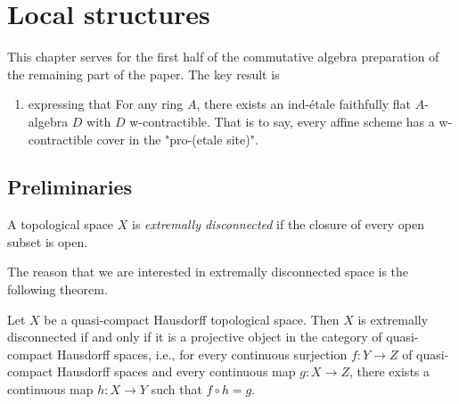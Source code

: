\chapter{Local structures}

This chapter serves for the first half of the commutative algebra preparation of the remaining part of the paper. The key result is
\begin{enumerate}
  \item {} expressing that For any ring $A$, there 
  exists an ind-étale faithfully flat $A$-algebra $D$ with $D$ w-contractible. That is to say, 
  every affine scheme has a w-contractible cover in the "pro-(etale site)".
\end{enumerate}

\section{Preliminaries}

\begin{definition}
  \label{def:extremally-disconnected}
  \mathlibok
  \leanok

  A topological space \(X\) is \emph{extremally disconnected} if the closure of every open subset is open.
\end{definition}

The reason that we are interested in extremally disconnected space is the following theorem.

\begin{theorem}
  \label{thm:extremally-disconnected-projective}
  \mathlibok
  \leanok
  Let \(X\) be a quasi-compact Hausdorff topological space. Then \(X\) is extremally disconnected if and only if it is a projective object in the category of quasi-compact Hausdorff spaces, i.e., for every continuous surjection \(f : Y \to Z\) of quasi-compact Hausdorff spaces and every continuous map \(g : X \to Z\), there exists a continuous map \(h : X \to Y\) such that \(f \circ h = g\).
\end{theorem}

